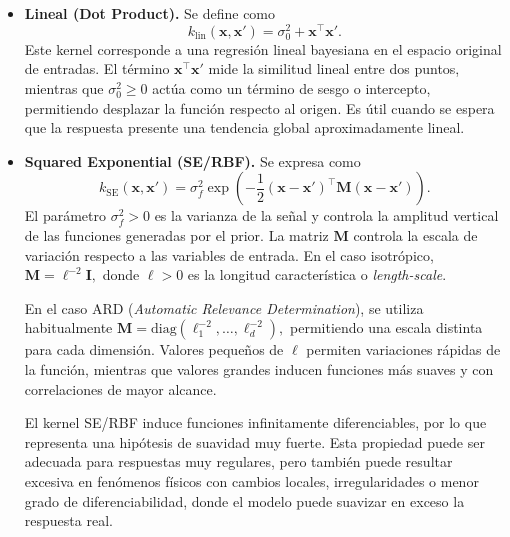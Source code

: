 \begin{itemize}
    \item \textbf{Lineal (Dot Product).} Se define como
    \[
    k_{\mathrm{lin}}(\bm{x},\bm{x}')
    =
    \sigma_0^2 + \bm{x}^\top \bm{x}'.
    \]
    Este kernel corresponde a una regresión lineal bayesiana en el espacio original de
    entradas. El término \(\bm{x}^\top\bm{x}'\) mide la similitud lineal entre dos puntos,
    mientras que \(\sigma_0^2\geq 0\) actúa como un término de sesgo o intercepto, permitiendo
    desplazar la función respecto al origen. Es útil cuando se espera que la respuesta presente
    una tendencia global aproximadamente lineal.

    \item \textbf{Squared Exponential (SE/RBF).} Se expresa como
    \[
    k_{\mathrm{SE}}(\bm{x},\bm{x}')
    =
    \sigma_f^2
    \exp\left(
    -\frac{1}{2}(\bm{x}-\bm{x}')^\top
    \bm{M}
    (\bm{x}-\bm{x}')
    \right).
    \]
    El parámetro \(\sigma_f^2>0\) es la varianza de la señal y controla la amplitud vertical de
    las funciones generadas por el prior. La matriz \(\bm{M}\) controla la escala de variación
    respecto a las variables de entrada. En el caso isotrópico,
    \(
    \bm{M}=\ell^{-2}\bm{I},
    \)
    donde \(\ell>0\) es la longitud característica o \emph{length-scale}. 
    
    En el caso ARD (\emph{Automatic Relevance Determination}), se utiliza habitualmente
    \(
    \bm{M}=\mathrm{diag}(\ell_1^{-2},\dots,\ell_d^{-2}),
    \)
    permitiendo una escala distinta para cada dimensión. Valores pequeños de \(\ell\) permiten
    variaciones rápidas de la función, mientras que valores grandes inducen funciones más
    suaves y con correlaciones de mayor alcance.

    El kernel SE/RBF induce funciones infinitamente diferenciables, por lo que representa una
    hipótesis de suavidad muy fuerte. Esta propiedad puede ser adecuada para respuestas muy
    regulares, pero también puede resultar excesiva en fenómenos físicos con cambios locales,
    irregularidades o menor grado de diferenciabilidad, donde el modelo puede suavizar en
    exceso la respuesta real.
    

\end{itemize}
